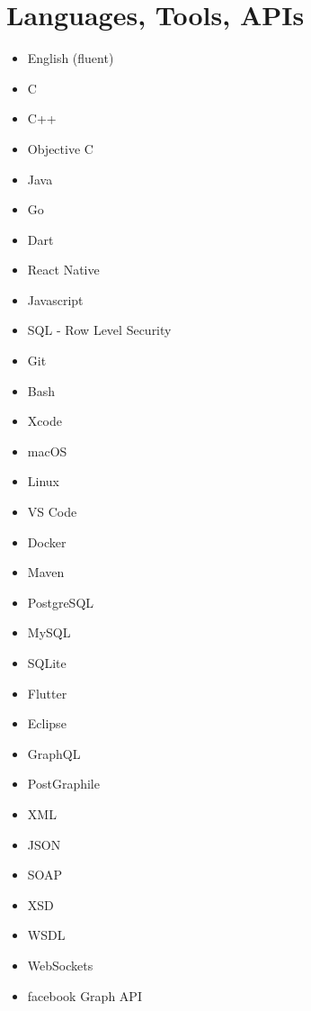 \documentclass[10pt, a4paper]{article}
\begin{document}
\section*{Languages, Tools, APIs}
\begin{itemize}
          \item English (fluent)
          \item C
          \item C++
          \item Objective C
          \item Java
          \item Go
          \item Dart
          \item React Native
          \item Javascript
          \item SQL - Row Level Security
          \item Git
          \item Bash
          \item Xcode
          \item macOS
          \item Linux
          \item VS Code
          \item Docker
          \item Maven
          \item PostgreSQL
          \item MySQL
          \item SQLite
          \item Flutter
          \item Eclipse
          \item GraphQL
          \item PostGraphile
          \item XML
          \item JSON
          \item SOAP
          \item XSD
          \item WSDL
          \item WebSockets
          \item facebook Graph API
    \end{itemize}


\vspace{25pt}
\end{document}
